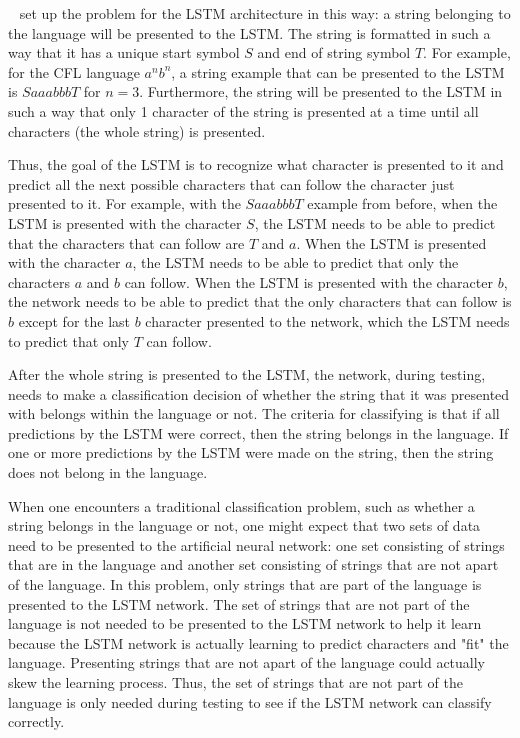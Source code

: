 \documentclass[11pt,letterpaper]{article}
\begin{document}
~\cite{Gers:01} set up the problem for the LSTM architecture in this way: a string belonging to the language will be presented to the LSTM. The string is formatted in such a way that it has a unique start symbol $S$ and end of string symbol $T$. For example, for the CFL language $a^nb^n$, a string example that can be presented to the LSTM is $SaaabbbT$ for $n = 3$. Furthermore, the string will be presented to the LSTM in such a way that only 1 character of the string is presented at a time until all characters (the whole string) is presented. 

Thus, the goal of the LSTM is to recognize what character is presented to it and predict all the next possible characters that can follow the character just presented to it. For example, with the $SaaabbbT$ example from before, when the LSTM is presented with the character $S$, the LSTM needs to be able to predict that the characters that can follow are $T$ and $a$. When the LSTM is presented with the character $a$, the LSTM needs to be able to predict that only the characters $a$ and $b$ can follow. When the LSTM is presented with the character $b$, the network needs to be able to predict that the only characters that can follow is $b$ except for the last $b$ character presented to the network, which the LSTM needs to predict that only $T$ can follow.

After the whole string is presented to the LSTM, the network, during testing, needs to make a classification decision of whether the string that it was presented with belongs within the language or not. The criteria for classifying is that if all predictions by the LSTM were correct, then the string belongs in the language. If one or more predictions by the LSTM were made on the string, then the string does not belong in the language.

When one encounters a traditional classification problem, such as whether a string belongs in the language or not, one might expect that two sets of data need to be presented to the artificial neural network: one set consisting of strings that are in the language and another set consisting of strings that are not apart of the language. In this problem, only strings that are part of the language is presented to the LSTM network. The set of strings that are not part of the language is not needed to be presented to the LSTM network to help it learn because the LSTM network is actually learning to predict characters and "fit" the language. Presenting strings that are not apart of the language could actually skew the learning process. Thus, the set of strings that are not part of the language is only needed during testing to see if the LSTM network can classify correctly. 
\end{document}
